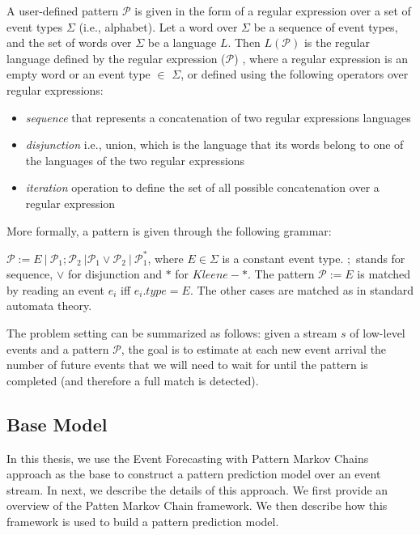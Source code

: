 \par A user-defined pattern $\mathcal{P}$ is given in the form of a regular expression over  a set of event types $\Sigma$ (i.e., alphabet). Let a word over $\Sigma$ be a sequence of event types, and the set of words over $\Sigma$ be a language  $L$. Then $L(\mathcal{P})$ is the regular language defined by the regular expression ($\mathcal{P}$) \cite{hopcroft2006automata,nuel_pattern_2008,alevizos2017event},  where a regular expression is an empty word or an event type $\in$ $\Sigma$, or  defined using the following operators over regular expressions:
\begin{itemize}[noitemsep]
	\item \textit{sequence} that represents a concatenation of two regular expressions languages 
	\item \textit{disjunction} i.e., union, which is the language that its words belong to one of the languages of the two regular expressions 
	\item \textit{iteration} operation to define the set of all possible concatenation over a regular expression
\end{itemize}

More formally, a pattern is given through the following grammar:
\begin{definition}
$\mathcal{P} := E\ |\ \mathcal{P}_{1} ; \mathcal{P}_{2}\ | \mathcal{P}_{1} \vee \mathcal{P}_{2}\ |\ \mathcal{P}_{1}^{*}  $, where $E \in \Sigma$ is a constant event type. $;$ stands for sequence, $\vee$ for disjunction and $*$ for $\mathit{Kleene}-*$.
The pattern $\mathcal{P} := E$ is matched by reading an event $e_i$ iff $e_{i}.type = E$.
The other cases are matched as in standard automata theory.
\end{definition}


The problem setting can be summarized as follows: given a stream $s$ of low-level events and a pattern $\mathcal{P}$, 
the goal is to estimate at each new event arrival the number of future events
that we will need to wait for until the pattern is completed (and therefore a full match is detected).

\subsection{Base Model}
\label{sec:Event-Forecasting-PMC}

\par In this thesis, we use the Event Forecasting with Pattern Markov Chains approach \cite{alevizos2017event} as the base to construct a pattern prediction model over an event stream. In next, we describe the details of this approach. We first provide an overview of the Patten Markov Chain framework. We then describe how this framework is used to build a pattern prediction model.  

